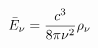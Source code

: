 \documentclass[preview]{standalone}
\begin{document}
\begin{align*}
\bar{E}_{\nu}= { c ^{3}  \over 8\pi\nu^{2} } \rho_{\nu}
\end{align*}
\end{document}
